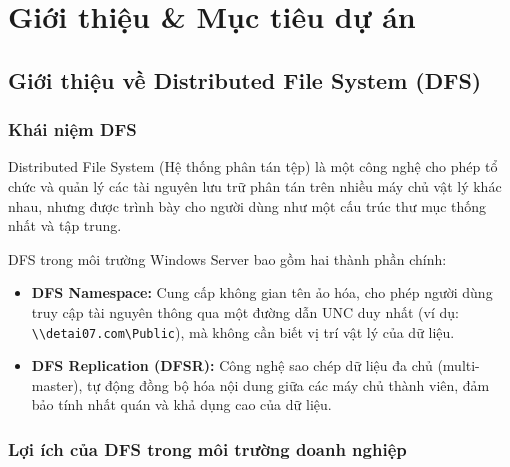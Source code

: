 \chapter{ Giới thiệu \& Mục tiêu dự án}
\section{Giới thiệu về Distributed File System (DFS)}

\subsection{Khái niệm DFS}

Distributed File System (Hệ thống phân tán tệp) là một công nghệ cho phép tổ chức và quản lý các tài nguyên lưu trữ phân tán trên nhiều máy chủ vật lý khác nhau, nhưng được trình bày cho người dùng như một cấu trúc thư mục thống nhất và tập trung.

DFS trong môi trường Windows Server bao gồm hai thành phần chính:

\begin{itemize}
    \item \textbf{DFS Namespace:} Cung cấp không gian tên ảo hóa, cho phép người dùng truy cập tài nguyên thông qua một đường dẫn UNC duy nhất (ví dụ: \texttt{\textbackslash\textbackslash detai07.com\textbackslash Public}), mà không cần biết vị trí vật lý của dữ liệu.
    
    \item \textbf{DFS Replication (DFSR):} Công nghệ sao chép dữ liệu đa chủ (multi-master), tự động đồng bộ hóa nội dung giữa các máy chủ thành viên, đảm bảo tính nhất quán và khả dụng cao của dữ liệu.
\end{itemize}

\subsection{Lợi ích của DFS trong môi trường doanh nghiệp}

